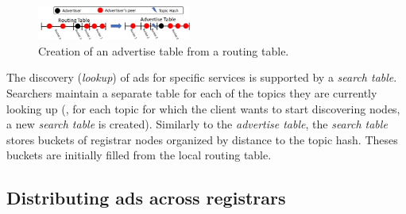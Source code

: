\begin{figure}
    \includegraphics[width=0.45\textwidth]{img/tables}
    \vspace{-0.05in}
    \caption{Creation of an advertise table from a routing table.} %
    \label{fig:advertise_table}
    \vspace{-0.15in}
 \end{figure}

The discovery (\emph{lookup}) of ads for specific services is supported by a \emph{search table}.
Searchers maintain a separate table for each of the topics they are currently looking up (\ie, for each topic for which the client wants to start discovering nodes, a new \emph{search table} is created).
Similarly to the \emph{advertise table}, the \emph{search table} stores buckets of registrar nodes organized by distance to the topic hash.
Theses buckets are initially filled from the local routing table. %


\subsection{Distributing ads across registrars}
\label{sec:registration_multi}

